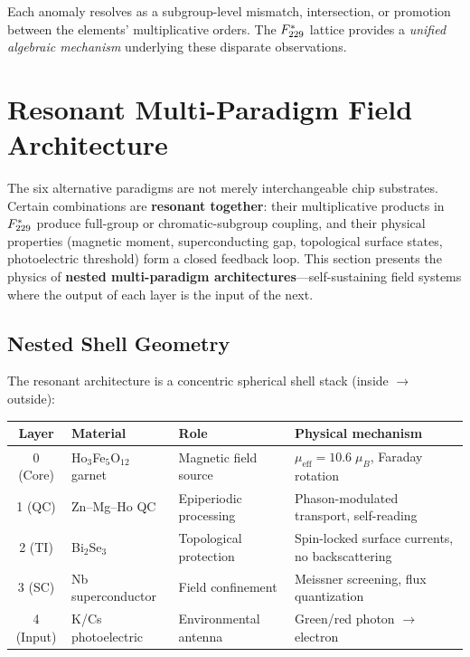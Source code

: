 \noindent Each anomaly resolves as a subgroup-level mismatch, intersection, or promotion between the elements' multiplicative orders. The $F_{229}^*$ lattice provides a \emph{unified algebraic mechanism} underlying these disparate observations.

\section{Resonant Multi-Paradigm Field Architecture}

The six alternative paradigms are not merely interchangeable chip substrates. Certain combinations are \textbf{resonant together}: their multiplicative products in $F_{229}^*$ produce full-group or chromatic-subgroup coupling, and their physical properties (magnetic moment, superconducting gap, topological surface states, photoelectric threshold) form a closed feedback loop. This section presents the physics of \textbf{nested multi-paradigm architectures}---self-sustaining field systems where the output of each layer is the input of the next.

\subsection{Nested Shell Geometry}

The resonant architecture is a concentric spherical shell stack (inside $\to$ outside):

\begin{center}
\begin{tabular}{@{}clll@{}}
\toprule
\textbf{Layer} & \textbf{Material} & \textbf{Role} & \textbf{Physical mechanism} \\
\midrule
0 (Core) & Ho$_3$Fe$_5$O$_{12}$ garnet & Magnetic field source & $\mu_{\text{eff}} = 10.6\;\mu_B$, Faraday rotation \\
1 (QC) & Zn--Mg--Ho QC & Epiperiodic processing & Phason-modulated transport, self-reading \\
2 (TI) & Bi$_2$Se$_3$ & Topological protection & Spin-locked surface currents, no backscattering \\
3 (SC) & Nb superconductor & Field confinement & Meissner screening, flux quantization \\
4 (Input) & K/Cs photoelectric & Environmental antenna & Green/red photon $\to$ electron \\
\bottomrule
\end{tabular}
\end{center}

